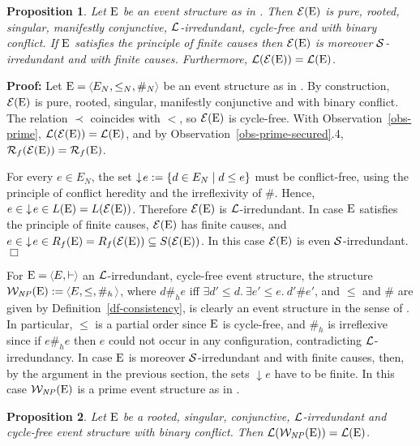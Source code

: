 \documentclass[twocolumn]{article}
\newtheorem{prop}{Proposition}[section]
\newenvironment{proposition}[1]{\begin{prop} \rm \label{pr-#1} }{\end{prop}}
\newenvironment{proof}{\begin{trivlist} \item[\hspace{\labelsep}\bf
Proof:]}{\hfill $\Box$\end{trivlist}}
\newcommand{\df}[1]{Definition~\ref{df-#1}}
\newcommand{\ob}[1]{Observation~\ref{obs-#1}}
\newcommand{\turn}{\vdash}                              \newcommand{\dbigcup}{\bigcup_{\uparrow}}		\newcommand{\nbigcup}{\bigcup_{\bullet}}		\newcommand{\nbigcap}{\bigcap_{\bullet}}		\newcommand{\bbigcup}{\overline{\bigcup}}		\newcommand{\bbigcap}{\overline{\bigcap}}		\newcommand{\nbbigcap}{\bbigcap_{\bullet}}		\newcommand{\fbbigcup}{\overline{\bigcup}^f}		\newcommand{\bbbigcup}{\overline{\bigcup}^2}		\newcommand{\dcup}{~~\makebox[0pt]{\LARGE$\cdot$}\makebox[0pt]{$\cup$}~~}
\begin{document}
\begin{proposition}{prime-bc to ours}
Let ${\rm E}$ be an event structure as in \cite{NPW81}. Then ${\cal E}({\rm E})$ is
pure, rooted, singular, manifestly conjunctive, ${\cal L}$-irredundant,
cycle-free and with binary conflict. If ${\rm E}$ satisfies the principle
of finite causes then ${\cal E}({\rm E})$ is moreover ${\cal S}$-irredundant and
with finite causes. Furthermore, ${\cal L}({\cal E}({\rm E})) = {\cal L}({\rm E})$.
\end{proposition}

\begin{proof} Let $\eE=\tuple{E_N,\leq_N,\#_N}$ be an event structure as in
\cite{NPW81}. By construction, ${\cal E}({\rm E})$ is pure, rooted, singular,
manifestly conjunctive and with binary conflict.
The relation $\prec$ coincides with $<$, so ${\cal E}({\rm E})$ is cycle-free.
With \ob{prime}, ${\cal L}({\cal E}({\rm E})) = {\cal L}({\rm E})$, and by \ob{prime-secured}.4,
${\cal R}_f({\cal E}({\rm E})) = {\cal R}_f({\rm E})$.

For every $e \in E_N$, the set $\downarrow\! e := \{d \in E_N \mid d
\leq e\}$ must be conflict-free, using the principle of conflict heredity
and the irreflexivity of $\#$.  Hence, $e \in \mbox{$\downarrow\! e$} \in
L({\rm E}) = L({\cal E}({\rm E}))$.  Therefore ${\cal E}({\rm E})$ is ${\cal L}$-irredundant.
In case ${\rm E}$ satisfies the principle of finite causes,
${\cal E}({\rm E})$ has finite causes, and $e \in\;\downarrow\! e \in R_f({\rm E})
= R_f({\cal E}({\rm E})) \subseteq S({\cal E}({\rm E}))$. In this case ${\cal E}({\rm E})$ is
even ${\cal S}$-irredundant.
\end{proof}
For $\eE=\tuple{E,\turn\;}$ an ${\cal L}$-irredundant, cycle-free event
structure, the structure ${\cal W}_{\it NP}(\eE) := \tuple{E,\leq,\#_h\,}$,
where $d \#_h e$ iff $\exists d' \leq d.~\exists e' \leq e.~d'\#e'$,
and $\leq$ and $\#$ are given by \df{consistency}, is clearly an event
structure in the sense of \cite{NPW81}.  In particular, $\leq$ is a partial
order since ${\rm E}$ is cycle-free, and $\#_h$ is irreflexive since if
$e\#_h e$ then $e$ could not occur in any configuration, contradicting
${\cal L}$-irredundancy.  In case ${\rm E}$ is moreover ${\cal S}$-irredundant and
with finite causes, then, by the argument in the previous section, the
sets $\downarrow\!e$ have to be finite. In this case ${\cal W}_{\it NP}({\rm E})$
is a prime event structure as in \cite{Wi89}.

\begin{proposition}{ours to prime-bc}
Let ${\rm E}$ be a rooted, singular, conjunctive, ${\cal L}$-irredundant
and cycle-free event structure with binary conflict.  Then
${\cal L}({\cal W}_{\it NP}({\rm E})) = {\cal L}({\rm E})$.
\end{proposition}
\end{document}
